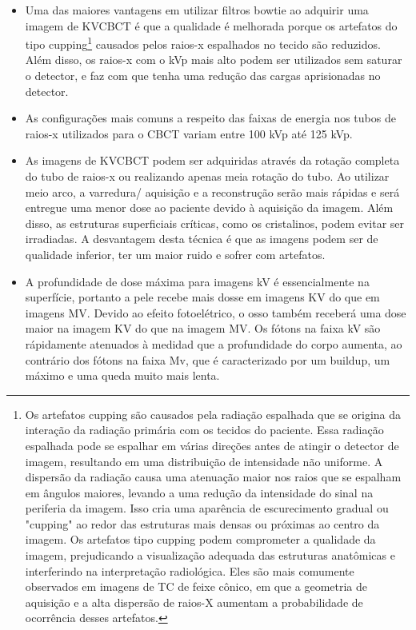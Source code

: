 \documentclass[11pt,a4paper]{article}
\newcounter{exemplo}
\begin{document}
\begin{exemplo}[IGRT]
\begin{itemize}
        \item Uma das maiores vantagens em utilizar filtros bowtie ao adquirir uma imagem de KVCBCT é que a qualidade é melhorada porque os artefatos do tipo cupping\footnote{Os artefatos cupping são causados pela radiação espalhada que se origina da interação da radiação primária com os tecidos do paciente. Essa radiação espalhada pode se espalhar em várias direções antes de atingir o detector de imagem, resultando em uma distribuição de intensidade não uniforme. A dispersão da radiação causa uma atenuação maior nos raios que se espalham em ângulos maiores, levando a uma redução da intensidade do sinal na periferia da imagem. Isso cria uma aparência de escurecimento gradual ou "cupping" ao redor das estruturas mais densas ou próximas ao centro da imagem. Os artefatos tipo cupping podem comprometer a qualidade da imagem, prejudicando a visualização adequada das estruturas anatômicas e interferindo na interpretação radiológica. Eles são mais comumente observados em imagens de TC de feixe cônico, em que a geometria de aquisição e a alta dispersão de raios-X aumentam a probabilidade de ocorrência desses artefatos.} causados pelos raios-x espalhados no tecido são reduzidos. Além disso, os raios-x com o kVp mais alto podem ser utilizados sem saturar o detector, e faz com que tenha uma redução das cargas aprisionadas no detector.
        
        \item As configurações mais comuns a respeito das faixas de energia nos tubos de raios-x utilizados para o CBCT variam entre 100 kVp até 125 kVp.
        
        \item As imagens de KVCBCT podem ser adquiridas através da rotação completa do tubo de raios-x ou realizando apenas meia rotação do tubo. Ao utilizar meio arco, a varredura/ aquisição e a reconstrução serão mais rápidas e será entregue uma menor dose ao paciente devido à aquisição da imagem. Além disso, as estruturas superficiais críticas, como os cristalinos, podem evitar ser irradiadas. A desvantagem desta técnica é que as imagens podem ser de qualidade inferior, ter um maior ruido e sofrer com artefatos.
        
        \item A profundidade de dose máxima para imagens kV é essencialmente na superfície, portanto a pele recebe mais dosse em imagens KV do que em imagens MV. Devido ao efeito fotoelétrico, o osso também receberá uma dose maior na imagem KV do que na imagem MV. Os fótons na faixa kV são rápidamente atenuados à medidad que a profundidade do corpo aumenta, ao contrário dos fótons na faixa Mv, que é caracterizado por um buildup, um máximo e uma queda muito mais lenta. 
        

\end{itemize}
\end{exemplo}
\end{document}
